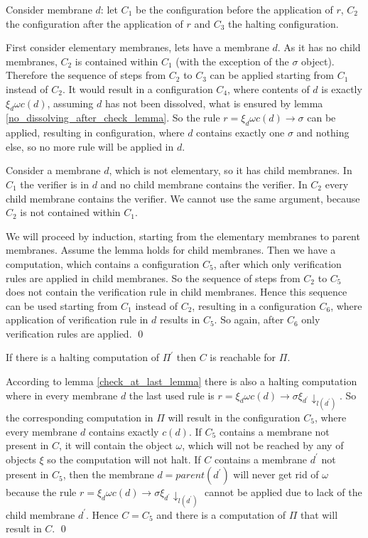 \begin{dokaz}
  Consider membrane $d$: let $C_1$ be the configuration before the application of $r$, $C_2$ the configuration after the application of $r$ and $C_3$ the halting configuration.

  First consider elementary membranes, lets have a membrane $d$. As it has no child membranes, $C_2$ is contained within $C_1$ (with the exception of the $\sigma$ object). Therefore the sequence of steps from $C_2$ to $C_3$ can be applied starting from $C_1$ instead of $C_2$.
  It would result in a configuration $C_4$, where contents of $d$ is exactly $\xi_d\omega c(d)$, assuming $d$ has not been dissolved, what is ensured by lemma \ref{no_dissolving_after_check_lemma}. So the rule $r = \xi_d\omega c(d)\rightarrow\sigma$ can be applied, resulting in configuration, where $d$ contains exactly one $\sigma$ and nothing else, so no more rule will be applied in $d$.

  Consider a membrane $d$, which is not elementary, so it has child membranes. In $C_1$ the verifier is in $d$ and no child membrane contains the verifier. In $C_2$ every child membrane contains the verifier. We cannot use the same argument, because $C_2$ is not contained within $C_1$.

  We will proceed by induction, starting from the elementary membranes to parent membranes. Assume the lemma holds for child membranes. Then we have a computation, which contains a configuration $C_5$, after which only verification rules are applied in child membranes. So the sequence of steps from $C_2$ to $C_5$ does not contain the verification rule in child membranes. Hence this sequence can be used starting from $C_1$ instead of $C_2$, resulting in a configuration $C_6$, where application of verification rule in $d$ results in $C_5$. So again, after $C_6$ only verification rules are applied.
  \qed
\end{dokaz}

\begin{lemma}
\label{if_halting_then_reachable_lemma}
  If there is a halting computation of $\Pi^\prime$ then $C$ is reachable for $\Pi$.
\end{lemma}

\begin{dokaz}
  According to lemma \ref{check_at_last_lemma} there is also a halting computation where in every membrane $d$ the last used rule is $r = \xi_d\omega c(d)\rightarrow\sigma\xi_{d^\prime}\downarrow_{l(d^\prime)}$. So the corresponding computation in $\Pi$ will result in the configuration $C_5$, where every membrane $d$ contains exactly $c(d)$. If $C_5$ contains a membrane not present in $C$, it will contain the object $\omega$, which will not be reached by any of objects $\xi$ so the computation will not halt. If $C$ contains a membrane $d^\prime$ not present in $C_5$, then the membrane $d = parent(d^\prime)$ will never get rid of $\omega$ because the rule $r = \xi_d\omega c(d)\rightarrow\sigma\xi_{d^\prime}\downarrow_{l(d^\prime)}$ cannot be applied due to lack of the child membrane $d^\prime$. Hence $C = C_5$ and there is a computation of $\Pi$ that will result in $C$. \qed
\end{dokaz}

